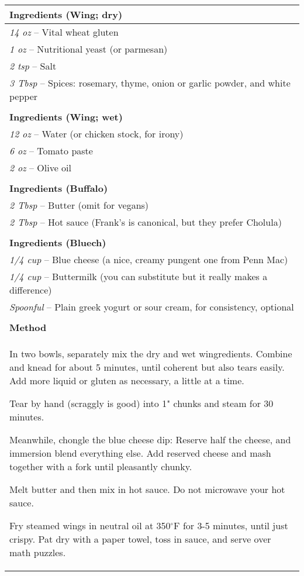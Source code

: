\documentclass[12pt]{article}
\begin{document}
\noindent \begin{tabular}{p{}}
	{\bf Ingredients (Wing; dry)} \\
	\hline
	{\em 14 oz} -- Vital wheat gluten \\
	{\em 1 oz} -- Nutritional yeast (or parmesan) \\
	{\em 2 tsp} -- Salt \\
	{\em 3 Tbsp} -- Spices: rosemary, thyme, onion or garlic powder, and white pepper \\
	\\
	{\bf Ingredients (Wing; wet)} \\
	\hline
	{\em 12 oz} -- Water (or chicken stock, for irony) \\
	{\em 6 oz} -- Tomato paste \\
	{\em 2 oz} -- Olive oil \\
	\\
	{\bf Ingredients (Buffalo)} \\
	\hline
	{\em 2 Tbsp} -- Butter (omit for vegans) \\
	{\em 2 Tbsp} -- Hot sauce (Frank's is canonical, but they prefer Cholula) \\
	\\
	{\bf Ingredients (Bluech)} \\
	\hline
	{\em 1/4 cup} -- Blue cheese (a nice, creamy pungent one from Penn Mac) \\
	{\em 1/4 cup} -- Buttermilk (you can substitute but it really makes a difference) \\
	{\em Spoonful} -- Plain greek yogurt or sour cream, for consistency, optional \\
	\\
	{\bf Method} \\
	\hline
\setlength{\parskip}{0.5em}
	In two bowls, separately mix the dry and wet wingredients. Combine and knead for about 5 minutes, until coherent but also tears easily. Add more liquid or gluten as necessary, a little at a time.

	Tear by hand (scraggly is good) into 1" chunks and steam for 30 minutes.

	Meanwhile, chongle the blue cheese dip: Reserve half the cheese, and immersion blend everything else. Add reserved cheese and mash together with a fork until pleasantly chunky.

	Melt butter and then mix in hot sauce. Do not microwave your hot sauce.

	Fry steamed wings in neutral oil at 350$^{\circ}$F for 3-5 minutes, until just crispy. Pat dry with a paper towel, toss in sauce, and serve over math puzzles.
\end{tabular}
\end{document}

